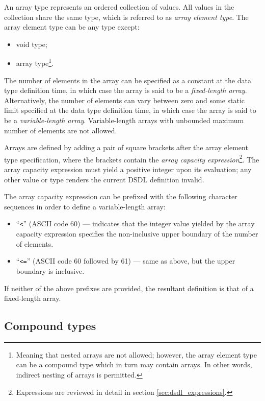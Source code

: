 An array type represents an ordered collection of values.
All values in the collection share the same type, which is referred to as \emph{array element type}.
The array element type can be any type except:
\begin{itemize}
    \item void type;
    \item array type\footnote{Meaning that nested arrays are not allowed;
    however, the array element type can be a compound type which in turn may contain arrays.
    In other words, indirect nesting of arrays is permitted.}.
\end{itemize}

The number of elements in the array can be specified as a constant at the data type definition time,
in which case the array is said to be a \emph{fixed-length array}.
Alternatively, the number of elements can vary between zero and some static limit specified
at the data type definition time,
in which case the array is said to be a \emph{variable-length array}.
Variable-length arrays with unbounded maximum number of elements are not allowed.

Arrays are defined by adding a pair of square brackets after the array element type specification,
where the brackets contain the \emph{array capacity expression}\footnote{%
Expressions are reviewed in detail in section \ref{sec:dsdl_expressions}.}.
The array capacity expression must yield a positive integer upon its evaluation;
any other value or type renders the current DSDL definition invalid.

The array capacity expression can be prefixed with the following character sequences in order to define
a variable-length array:
\begin{itemize}
    \item ``\verb|<|'' (ASCII code 60) --- indicates that the integer value yielded by the array capacity expression
    specifies the non-inclusive upper boundary of the number of elements.

    \item ``\verb|<=|'' (ASCII code 60 followed by 61) --- same as above, but the upper boundary is inclusive.
\end{itemize}
If neither of the above prefixes are provided, the resultant definition is that of a fixed-length array.

\subsection{Compound types}

